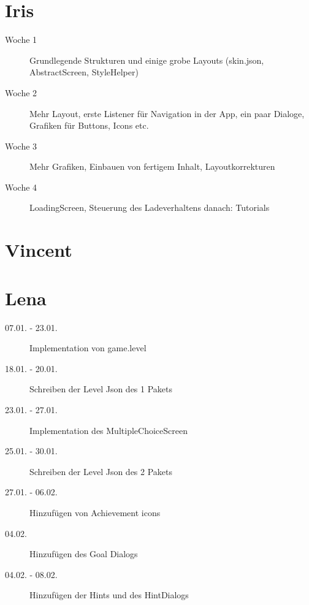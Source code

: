 \section{Iris}
\begin{description}
\item[Woche 1]
Grundlegende Strukturen und einige grobe Layouts (skin.json, AbstractScreen, StyleHelper)
\item[Woche 2]
Mehr Layout, erste Listener für Navigation in der App, ein paar Dialoge, Grafiken für Buttons, Icons etc.
\item[Woche 3]
Mehr Grafiken, Einbauen von fertigem Inhalt, Layoutkorrekturen
\item[Woche 4]
LoadingScreen, Steuerung des Ladeverhaltens
danach: Tutorials
\end{description}

\section{Vincent}

\section{Lena}
\begin{description}
\item[07.01. - 23.01.]
Implementation von game.level
\item[18.01. - 20.01.]
Schreiben der Level Json des 1 Pakets
\item[23.01. - 27.01.]
Implementation des MultipleChoiceScreen
\item[25.01. - 30.01.]
Schreiben der Level Json des 2 Pakets
\item[27.01. - 06.02.]
Hinzufügen von Achievement icons
\item[04.02.]
Hinzufügen des Goal Dialogs
\item[04.02. - 08.02.]
Hinzufügen der Hints und des HintDialogs
\end{description}
